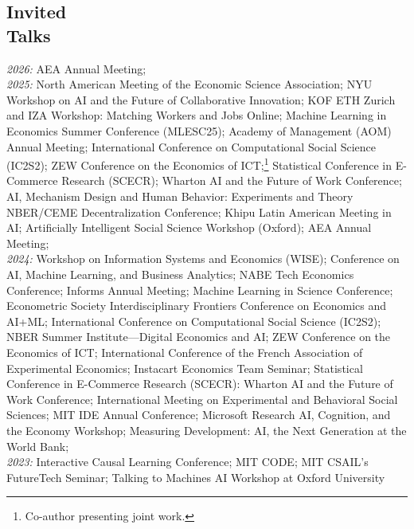 \documentclass[margin,line,pifont,palatino,courier, 9pt]{res}
\begin{document}
\begin{resume}
\section{\sc Invited\\Talks\footnotemark}
\textit{2026:} 
AEA Annual Meeting;\vspace{2mm}\\
\textit{2025:} 
North American Meeting of the Economic Science Association;
NYU Workshop on AI and the Future of Collaborative Innovation;
KOF ETH Zurich and IZA Workshop: Matching Workers and Jobs Online;
Machine Learning in Economics Summer Conference (MLESC25);
Academy of Management (AOM) Annual Meeting;
International Conference on Computational Social Science (IC2S2);
ZEW Conference on the Economics of ICT;\footnote{Co-author presenting joint work.}
Statistical Conference in E-Commerce Research (SCECR)\footnotemark[\value{footnote}];
Wharton AI and the Future of Work Conference;
AI, Mechanism Design and Human Behavior: Experiments and Theory NBER/CEME Decentralization Conference;
Khipu Latin American Meeting in AI;
Artificially Intelligent Social Science Workshop (Oxford);
AEA Annual Meeting;\vspace{2mm}\\
\textit{2024:} Workshop on Information Systems and Economics (WISE)\footnotemark[\value{footnote}];
Conference on AI, Machine Learning, and Business Analytics;
NABE Tech Economics Conference; 
Informs Annual Meeting\footnotemark[\value{footnote}];
Machine Learning in Science Conference;
Econometric Society Interdisciplinary Frontiers Conference on Economics and AI+ML; 
International Conference on Computational Social Science (IC2S2)\footnotemark[\value{footnote}];
NBER Summer Institute---Digital Economics and AI\footnotemark[\value{footnote}];
ZEW Conference on the Economics of ICT;
International Conference of the French Association of Experimental Economics;
Instacart Economics Team Seminar;
Statistical Conference in E-Commerce Research (SCECR):
Wharton AI and the Future of Work Conference; 
International Meeting on Experimental and Behavioral Social Sciences;
MIT IDE Annual Conference; 
Microsoft Research AI, Cognition, and the Economy Workshop; 
Measuring Development: AI, the Next Generation at the World Bank; 
\vspace{2mm}\\
\textit{2023:} Interactive Causal Learning Conference; 
MIT CODE; 
MIT CSAIL's FutureTech Seminar;
Talking to Machines AI Workshop at Oxford University


\end{resume}
\end{document}
